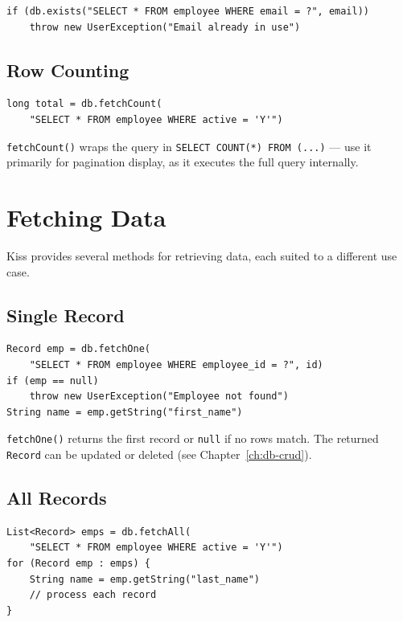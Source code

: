\begin{lstlisting}[style=groovy]
if (db.exists("SELECT * FROM employee WHERE email = ?", email))
    throw new UserException("Email already in use")
\end{lstlisting}

\subsection{Row Counting}

\begin{lstlisting}[style=groovy]
long total = db.fetchCount(
    "SELECT * FROM employee WHERE active = 'Y'")
\end{lstlisting}

\noindent
\texttt{fetchCount()} wraps the query in \texttt{SELECT COUNT(*) FROM (...)} --- use it primarily for pagination display, as it executes the full query internally.

\section{Fetching Data}
\label{sec:db-fetch}

Kiss provides several methods for retrieving data, each suited to a different use case.

\subsection{Single Record}

\begin{lstlisting}[style=groovy]
Record emp = db.fetchOne(
    "SELECT * FROM employee WHERE employee_id = ?", id)
if (emp == null)
    throw new UserException("Employee not found")
String name = emp.getString("first_name")
\end{lstlisting}

\noindent
\texttt{fetchOne()} returns the first record or \texttt{null} if no rows match.  The returned \texttt{Record} can be updated or deleted (see Chapter~\ref{ch:db-crud}).

\subsection{All Records}

\begin{lstlisting}[style=groovy]
List<Record> emps = db.fetchAll(
    "SELECT * FROM employee WHERE active = 'Y'")
for (Record emp : emps) {
    String name = emp.getString("last_name")
    // process each record
}
\end{lstlisting}

